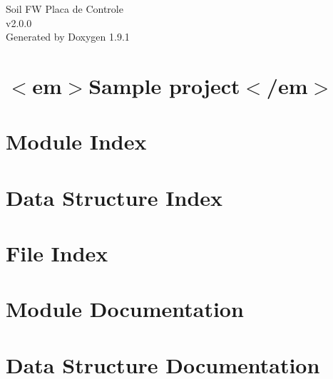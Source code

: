 \let\mypdfximage\pdfximage\def\pdfximage{\immediate\mypdfximage}\documentclass[twoside]{book}
\newcommand{\+}{\discretionary{\mbox{\scriptsize$\hookleftarrow$}}{}{}}
\newcommand{\clearemptydoublepage}{%
  \newpage{\pagestyle{empty}\cleardoublepage}%
}
\begin{document}
\raggedbottom

\hypersetup{pageanchor=false,
             bookmarksnumbered=true,
             pdfencoding=unicode
            }
\begin{titlepage}
\vspace*{7cm}
\begin{center}%
{\Large Soil FW Placa de Controle \\[1ex]\large v2.\+0.\+0 }\\
\vspace*{1cm}
{\large Generated by Doxygen 1.9.1}\\
\end{center}
\end{titlepage}
\clearemptydoublepage
{}
\tableofcontents
\clearemptydoublepage
{}
\hypersetup{pageanchor=true}

\chapter{$<$em$>$Sample project$<$/em$>$}
\label{md__home_brunolima_eclipse_workspace_fw__placa_de_controle_2_0__r_e_a_d_m_e}

\chapter{Module Index}

\chapter{Data Structure Index}

\chapter{File Index}

\chapter{Module Documentation}


\chapter{Data Structure Documentation}






\end{document}
